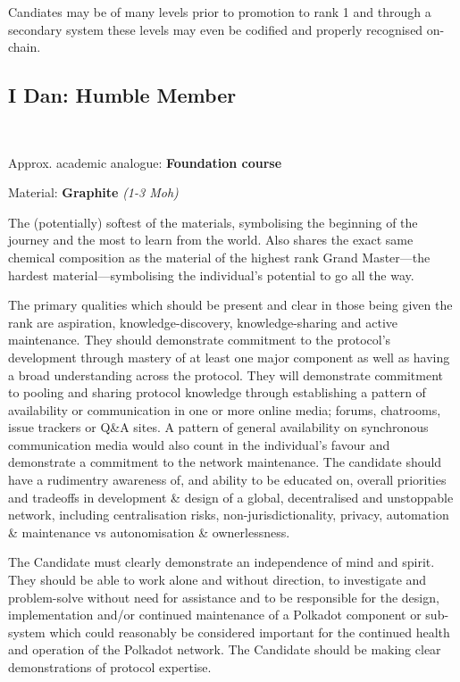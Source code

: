 \documentclass[9pt,oneside]{amsart}
\begin{document}
Candiates may be of many levels prior to promotion to rank 1 and through a secondary system these levels may even be codified and properly recognised on-chain.

\subsection{I Dan: Humble Member}\label{i-dan-humble-member}~\\


Approx. academic analogue: \textbf{Foundation course}

Material: \textbf{Graphite} \emph{(1-3 Moh)}

The (potentially) softest of the materials, symbolising the beginning of the journey and the most to learn from the world. Also shares the exact same chemical composition as the material of the highest rank Grand Master---the hardest material---symbolising the individual's potential to go all the way.

The primary qualities which should be present and clear in those being given the rank are aspiration, knowledge-discovery, knowledge-sharing and active maintenance. They should demonstrate commitment to the protocol's development through mastery of at least one major component as well as having a broad understanding across the protocol. They will demonstrate commitment to pooling and sharing protocol knowledge through establishing a pattern of availability or communication in one or more online media; forums, chatrooms, issue trackers or Q\&A sites. A pattern of general availability on synchronous communication media would also count in the individual's favour and demonstrate a commitment to the network maintenance. The candidate should have a rudimentry awareness of, and ability to be educated on, overall priorities and tradeoffs in development \& design of a global, decentralised and unstoppable network, including centralisation risks, non-jurisdictionality, privacy, automation \& maintenance vs autonomisation \& ownerlessness.

The Candidate must clearly demonstrate an independence of mind and spirit. They should be able to work alone and without direction, to investigate and problem-solve without need for assistance and to be responsible for the design, implementation and/or continued maintenance of a Polkadot component or sub-system which could reasonably be considered important for the continued health and operation of the Polkadot network. The Candidate should be making clear demonstrations of protocol expertise.
\end{document}
